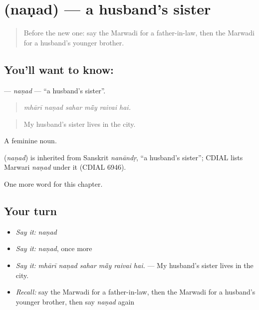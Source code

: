 \section[\texorpdfstring{\mw{नणद} (naṇad)}{नणद (naṇad)}]{ (naṇad) — a husband's sister}

\label{lesson:MW-C259-nanad}



\begin{quote}
Before the new one: say the Marwadi for a father-in-law, then the Marwadi for a husband's younger brother.
\end{quote}

\subsection*{You'll want to know: }
\textbf{} — \emph{naṇad} — \textquotedblleft{}a husband's sister\textquotedblright{}.

\begin{quote}
     
\end{quote}

\begin{quote}
\emph{mhārī naṇad sahar mā̃y raivai hai.}
\end{quote}

\begin{quote}
My husband's sister lives in the city.
\end{quote}

A feminine noun.

\begin{cousinweb}
\textbf{} (\emph{naṇad}) is inherited from Sanskrit \emph{nanāndṛ}, \textquotedblleft{}a husband's sister\textquotedblright{}; CDIAL lists Marwari \emph{naṇad} under it (CDIAL 6946).
\end{cousinweb}

\begin{grammarlens}[title={What you've built}]
One more word for this chapter.
\end{grammarlens}

\subsection*{Your turn}
\begin{itemize}
\raggedright
  \item \emph{Say it:} \emph{naṇad}
  \item \emph{Say it:} \emph{naṇad}, once more
  \item \emph{Say it:} \emph{mhārī naṇad sahar mā̃y raivai hai.} — My husband's sister lives in the city.
  \item \emph{Recall:} say the Marwadi for a father-in-law, then the Marwadi for a husband's younger brother, then say \emph{naṇad} again
\end{itemize}

